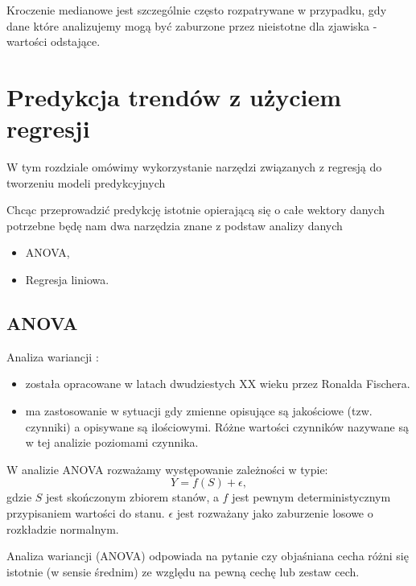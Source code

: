\documentclass[10pt,a4paper]{book}
\begin{document}
Kroczenie medianowe jest szczególnie często rozpatrywane w przypadku, gdy dane które analizujemy mogą być zaburzone przez nieistotne dla zjawiska - wartości odstające.   

\chapter{Predykcja trendów z użyciem regresji}

W tym rozdziale omówimy wykorzystanie narzędzi związanych z regresją do tworzeniu modeli predykcyjnych

Chcąc przeprowadzić predykcję istotnie opierającą się o całe wektory danych potrzebne będę nam dwa narzędzia znane z podstaw analizy danych
\begin{itemize}
\item ANOVA,
\item Regresja liniowa.
\end{itemize}

\section{ANOVA}

Analiza wariancji :
\begin{itemize}
\item została opracowane w latach dwudziestych XX wieku przez Ronalda Fischera. 
\item ma zastosowanie w sytuacji gdy zmienne opisujące są jakościowe (tzw. czynniki) a opisywane są ilościowymi.
Różne wartości czynników nazywane są w tej analizie poziomami czynnika.
\end{itemize} 

\begin{definition}[ANOVA]
W analizie ANOVA rozważamy występowanie zależności w typie:
\begin{equation*}
Y = f(S) + \epsilon,
\end{equation*}
gdzie $S$ jest skończonym zbiorem stanów, a $f$ jest pewnym deterministycznym przypisaniem wartości do stanu. $\epsilon$ jest rozważany jako zaburzenie losowe o rozkładzie normalnym.
\end{definition}

Analiza wariancji (ANOVA) odpowiada na pytanie czy objaśniana cecha różni się istotnie (w sensie średnim) ze względu na pewną cechę lub zestaw cech.
\end{document}
